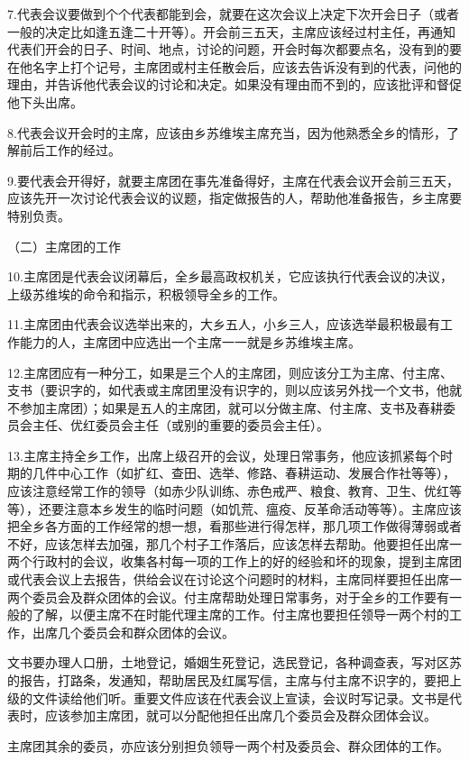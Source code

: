 7.代表会议要做到个个代表都能到会，就要在这次会议上决定下次开会日子（或者一般的决定比如逢五逢二十开等）。开会前三五天，主席应该经过村主任，再通知代表们开会的日子、时间、地点，讨论的问题，开会时每次都要点名，没有到的要在他名字上打个记号，主席团或村主任散会后，应该去告诉没有到的代表，问他的理由，并告诉他代表会议的讨论和决定。如果没有理由而不到的，应该批评和督促他下头出席。

8.代表会议开会时的主席，应该由乡苏维埃主席充当，因为他熟悉全乡的情形，了解前后工作的经过。

9.要代表会开得好，就要主席团在事先准备得好，主席在代表会议开会前三五天，应该先开一次讨论代表会议的议题，指定做报告的人，帮助他准备报告，乡主席要特别负责。

（二）主席团的工作

10.主席团是代表会议闭幕后，全乡最高政权机关，它应该执行代表会议的决议，上级苏维埃的命令和指示，积极领导全乡的工作。

11.主席团由代表会议选举出来的，大乡五人，小乡三人，应该选举最积极最有工作能力的人，主席团中应选出一个主席一一就是乡苏维埃主席。

12.主席团应有一种分工，如果是三个人的主席团，则应该分工为主席、付主席、支书（要识字的，如代表或主席团里没有识字的，则以应该另外找一个文书，他就不参加主席团）；如果是五人的主席团，就可以分做主席、付主席、支书及春耕委员会主任、优红委员会主任（或别的重要的委员会主任）。

13.主席主持全乡工作，出席上级召开的会议，处理日常事务，他应该抓紧每个时期的几件中心工作（如扩红、查田、选举、修路、春耕运动、发展合作社等等），应该注意经常工作的领导（如赤少队训练、赤色戒严、粮食、教育、卫生、优红等等），还要注意本乡发生的临时问题（如饥荒、瘟疫、反革命活动等等）。主席应该把全乡各方面的工作经常的想一想，看那些进行得怎样，那几项工作做得薄弱或者不好，应该怎样去加强，那几个村子工作落后，应该怎样去帮助。他要担任出席一两个行政村的会议，收集各村每一项的工作上的好的经验和坏的现象，提到主席团或代表会议上去报告，供给会议在讨论这个问题时的材料，主席同样要担任出席一两个委员会及群众团体的会议。付主席帮助处理日常事务，对于全乡的工作要有一般的了解，以便主席不在时能代理主席的工作。付主席也要担任领导一两个村的工作，出席几个委员会和群众团体的会议。

文书要办理人口册，土地登记，婚姻生死登记，选民登记，各种调查表，写对区苏的报告，打路条，发通知，帮助居民及红属写信，主席与付主席不识字的，要把上级的文件读给他们听。重要文件应该在代表会议上宣读，会议时写记录。文书是代表时，应该参加主席团，就可以分配他担任出席几个委员会及群众团体会议。

主席团其余的委员，亦应该分别担负领导一两个村及委员会、群众团体的工作。

